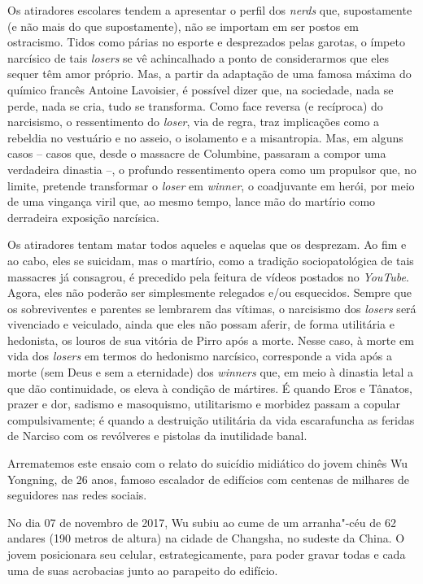 Os atiradores escolares tendem a apresentar o perfil dos \emph{nerds}
que, supostamente (e não mais do que supostamente), não se importam em
ser postos em ostracismo. Tidos como párias no esporte e desprezados
pelas garotas, o ímpeto narcísico de tais \emph{losers} se vê
achincalhado a ponto de considerarmos que eles sequer têm amor próprio.
Mas, a partir da adaptação de uma famosa máxima do químico francês
Antoine Lavoisier, é possível dizer que, na sociedade, nada se perde,
nada se cria, tudo se transforma. Como face reversa (e recíproca) do
narcisismo, o ressentimento do \emph{loser}, via de regra, traz
implicações como a rebeldia no vestuário e no asseio, o isolamento e a
misantropia. Mas, em alguns casos -- casos que, desde o massacre de
Columbine, passaram a compor uma verdadeira dinastia --, o profundo
ressentimento opera como um propulsor que, no limite, pretende
transformar o \emph{loser} em \emph{winner}, o coadjuvante em herói, por
meio de uma vingança viril que, ao mesmo tempo, lance mão do martírio
como derradeira exposição narcísica.

Os atiradores tentam matar todos aqueles e aquelas que os desprezam. Ao
fim e ao cabo, eles se suicidam, mas o martírio, como a tradição
sociopatológica de tais massacres já consagrou, é precedido pela feitura
de vídeos postados no \emph{YouTube}. Agora, eles não poderão ser
simplesmente relegados e/ou esquecidos. Sempre que os sobreviventes e
parentes se lembrarem das vítimas, o narcisismo dos \emph{losers} será
vivenciado e veiculado, ainda que eles não possam aferir, de forma
utilitária e hedonista, os louros de sua vitória de Pirro após a morte.
Nesse caso, à morte em vida dos \emph{losers} em termos do hedonismo
narcísico, corresponde a vida após a morte (sem Deus e sem a eternidade)
dos \emph{winners} que, em meio à dinastia letal a que dão continuidade,
os eleva à condição de mártires. É quando Eros e Tânatos, prazer e dor,
sadismo e masoquismo, utilitarismo e morbidez passam a copular
compulsivamente; é quando a destruição utilitária da vida escarafuncha
as feridas de Narciso com os revólveres e pistolas da inutilidade banal.

Arrematemos este ensaio com o relato do suicídio midiático do jovem
chinês Wu Yongning, de 26 anos, famoso escalador de edifícios com
centenas de milhares de seguidores nas redes sociais.

No dia 07 de novembro de 2017, Wu subiu ao cume de um arranha"-céu de 62
andares (190 metros de altura) na cidade de Changsha, no sudeste da
China. O jovem posicionara seu celular, estrategicamente, para poder
gravar todas e cada uma de suas acrobacias junto ao parapeito do
edifício.

